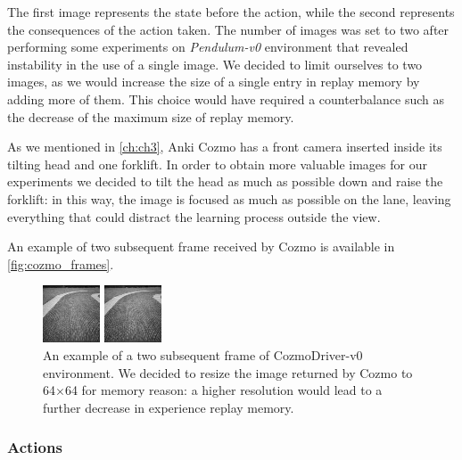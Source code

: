 The first image represents the state before the action, while the second represents the consequences of the action taken.
The number of images was set to two after performing some experiments on \textit{Pendulum-v0} environment that revealed instability in the use of a single image.
We decided to limit ourselves to two images, as we would increase the size of a single entry in replay memory by adding more of them.
This choice would have required a counterbalance such as the decrease of the maximum size of replay memory.

As we mentioned in \vref{ch:ch3}, Anki Cozmo has a front camera inserted inside its tilting head and one forklift.
In order to obtain more valuable images for our experiments we decided to tilt the head as much as possible down and raise the forklift: in this way, the image is focused as much as possible on the lane, leaving everything that could distract the learning process outside the view.

An example of two subsequent frame received by Cozmo is available in \vref{fig:cozmo_frames}.
\begin{figure}

	\begin{minipage}[t]{0.5\linewidth}
		\centering
		\includegraphics[height=0.25\paperwidth]{img/cozmo_frame_1.jpg}
	\end{minipage}
	\begin{minipage}[t]{0.5\linewidth}
		\centering
		\includegraphics[height=0.25\paperwidth]{img/cozmo_frame_2.jpg}
	\end{minipage}

	\caption[Example of two subsequent frame of CozmoDriver-v0]{An example of a two subsequent frame of CozmoDriver-v0 environment. We decided to resize the image returned by Cozmo to 64$\times$64 for memory reason: a higher resolution would lead to a further decrease in experience replay memory.}
	\label{fig:cozmo_frames}
\end{figure}

\subsubsection{Actions}

